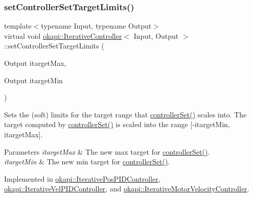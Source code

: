 \subsubsection{\texorpdfstring{setControllerSetTargetLimits()}{setControllerSetTargetLimits()}}
{\footnotesize\ttfamily template$<$typename Input, typename Output$>$ \\
virtual void \mbox{\hyperlink{classokapi_1_1IterativeController}{okapi\+::\+Iterative\+Controller}}$<$ Input, Output $>$\+::set\+Controller\+Set\+Target\+Limits (\begin{DoxyParamCaption}\item[{Output}]{itarget\+Max,  }\item[{Output}]{itarget\+Min }\end{DoxyParamCaption})\hspace{0.3cm}{\ttfamily [pure virtual]}}

Sets the (soft) limits for the target range that \mbox{\hyperlink{classokapi_1_1ControllerOutput_a360c08f0c10b36f882d6d3100c2cad49}{controller\+Set()}} scales into. The target computed by {\ttfamily \mbox{\hyperlink{classokapi_1_1ControllerOutput_a360c08f0c10b36f882d6d3100c2cad49}{controller\+Set()}}} is scaled into the range {\ttfamily \mbox{[}-\/itarget\+Min, itarget\+Max\mbox{]}}.


\begin{DoxyParams}{Parameters}
{\em itarget\+Max} & The new max target for {\ttfamily \mbox{\hyperlink{classokapi_1_1ControllerOutput_a360c08f0c10b36f882d6d3100c2cad49}{controller\+Set()}}}. \\
\hline
{\em itarget\+Min} & The new min target for {\ttfamily \mbox{\hyperlink{classokapi_1_1ControllerOutput_a360c08f0c10b36f882d6d3100c2cad49}{controller\+Set()}}}. \\
\hline
\end{DoxyParams}


Implemented in \mbox{\hyperlink{classokapi_1_1IterativePosPIDController_a556937096c9a1331e705a8fa9175c884}{okapi\+::\+Iterative\+Pos\+P\+I\+D\+Controller}}, \mbox{\hyperlink{classokapi_1_1IterativeVelPIDController_a054d5bff10ba504b9f72db567ad45bfb}{okapi\+::\+Iterative\+Vel\+P\+I\+D\+Controller}}, and \mbox{\hyperlink{classokapi_1_1IterativeMotorVelocityController_a083db063a4f8f15787a0c97068eef755}{okapi\+::\+Iterative\+Motor\+Velocity\+Controller}}.

\mbox{\label{classokapi_1_1IterativeController_ae1a7d9bd29d176a26bcc70c741f0d50f}} 
